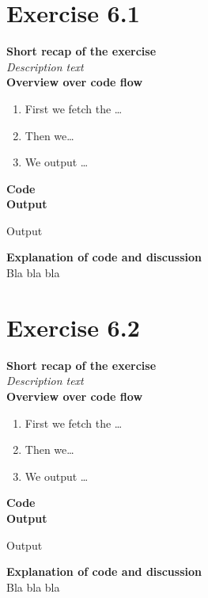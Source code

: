 \documentclass{article}
\newcommand\pythonstyle{\lstset{
language=python,
breaklines=true,
basicstyle=\ttfamily\small,
otherkeywords={1, 2, 3, 4, 5, 6, 7, 8 ,9 , 0, -, =, +, [, ], (, \), \{, \}, :, *, !},             %
keywordstyle=\color{blue},
emph={class, pass, in, for, while, if, is, elif, else, not, and, or, OR
    def, print, exec, break, continue, return},
emphstyle=\color{black}\bfseries,
emph={[2]True, False, None, self},
emphstyle=[2]\color{purple},
emph={[3]from, import, as},
emphstyle=[3]\color{blue},
stringstyle=\color{red},
frame=tb,
showstringspaces=false,
morecomment=[s]{"""}{"""},
commentstyle=\color{gray},
rulesepcolor=\color{blue},
title=\lstname
}}
\newcommand\pythonexternal[2][]{{
\pythonstyle
}}
\begin{document}
\section{Exercise 6.1}
\textbf{Short recap of the exercise}\\
\textit{Description text}\\

\textbf{Overview over code flow}\\

\begin{enumerate}
  \item First we fetch the \ldots
  \item Then we\ldots
  \item We output \ldots\\
\end{enumerate}

\textbf{Code}\\
\textbf{Output}
\begin{pythonOutput}
Output
\end{pythonOutput}
\textbf{Explanation of code and discussion}\\
Bla bla bla

\section{Exercise 6.2}
\textbf{Short recap of the exercise}\\
\textit{Description text}\\

\textbf{Overview over code flow}\\

\begin{enumerate}
  \item First we fetch the \ldots
  \item Then we\ldots
  \item We output \ldots\\
\end{enumerate}

\textbf{Code}\\
\textbf{Output}
\begin{pythonOutput}
Output
\end{pythonOutput}
\textbf{Explanation of code and discussion}\\
Bla bla bla
\end{document}
